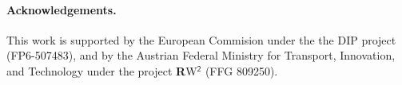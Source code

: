 \paragraph{Acknowledgements.}
This work is supported by the European Commision under the the DIP
project (FP6-507483), and by the Austrian Federal Ministry for
Transport, Innovation, and Technology under the project {\sffamily
 {\bfseries R}W$^{\mathsf{2}}$} (FFG 809250).
